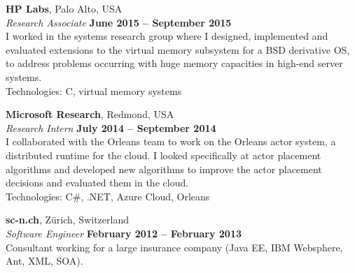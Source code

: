\documentclass[margin,line]{cv/cv}
\begin{document}
\begin{resume}
    \textbf{HP Labs}, Palo Alto, USA \vspace{2mm}\\\vspace{1mm}%
    \textsl{Research Associate} \hfill \textbf{June 2015 -- September 2015}\\
    I worked in the systems research group where I designed, implemented and
    evaluated extensions to the virtual memory subsystem for a BSD derivative OS,
    to address problems occurring with huge memory capacities in high-end server
    systems.\\ Technologies: C, virtual memory systems

    \textbf{Microsoft Research}, Redmond, USA \vspace{2mm}\\\vspace{1mm}%
    \textsl{Research Intern} \hfill \textbf{July 2014 -- September 2014}\\
    I collaborated with the Orleans team to work on the Orleans
    actor system, a distributed runtime for the cloud. I looked specifically at
    actor placement algorithms and developed new algorithms to improve the actor placement
    decisions and evaluated them in the cloud.\\ Technologies: C\#, .NET, Azure Cloud, Orleans

    \textbf{sc-n.ch}, Zürich, Switzerland \vspace{2mm}\\\vspace{1mm}%
    \textsl{Software Engineer} \hfill \textbf{February 2012 -- February 2013}\\
    Consultant working for a large insurance company (Java EE, IBM Websphere, Ant, XML, SOA).



\end{resume}
\end{document}
